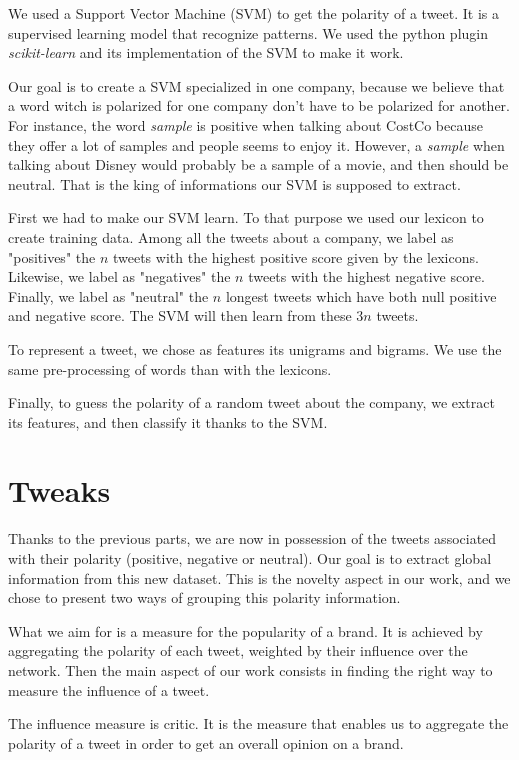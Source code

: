 \documentclass[a4paper,12pt]{report}
\begin{document}
We used a Support Vector Machine (SVM) to get the polarity of a tweet. It is a supervised learning model that recognize patterns. We used the python plugin \textit{scikit-learn}\cite{Scikit} and its implementation of the SVM to make it work.

Our goal is to create a SVM specialized in one company, because we believe that a word witch is polarized for one company don't have to be polarized for another.
For instance, the word \textit{sample} is positive when talking about CostCo because they offer a lot of samples and people seems to enjoy it. However, a \textit{sample} when talking about Disney would probably be a sample of a movie, and then should be neutral.
That is the king of informations our SVM is supposed to extract.

First we had to make our SVM learn. To that purpose we used our lexicon to create training data. Among all the tweets about a company, we label as "positives" the $n$ tweets with the highest positive score given by the lexicons. Likewise, we label as "negatives" the $n$ tweets with the highest negative score. Finally, we label as "neutral" the $n$ longest tweets which have both null positive and negative score. The SVM will then learn from these $3n$ tweets.

To represent a tweet, we chose as features its unigrams and bigrams. We use the same pre-processing of words than with the lexicons.

Finally, to guess the polarity of a random tweet about the company, we extract its features, and then classify it thanks to the SVM.

\section{Tweaks}

Thanks to the previous parts, we are now in possession of the tweets associated with their polarity (positive, negative or neutral). Our goal is to extract global information from this new dataset.
This is the novelty aspect in our work, and we chose to present two ways of grouping this polarity information.

What we aim for is a measure for the popularity of a brand. It is achieved by aggregating the polarity of each tweet, weighted by their influence over the network.
Then the main aspect of our work consists in finding the right way to measure the influence of a tweet.

The influence measure is critic. It is the measure that enables us to aggregate the polarity of a tweet in order to get an overall opinion on a brand.
\end{document}
